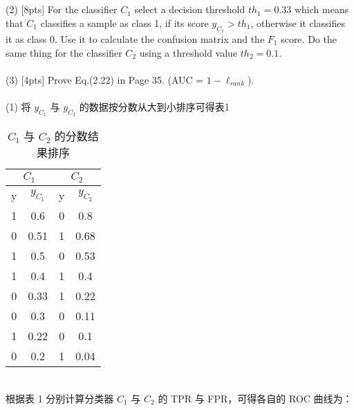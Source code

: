 \documentclass{article}
\begin{document}
	\\\\
	(2) [8pts] For the classifier $C_1$ select a decision threshold $th_1 = 0.33$ which means that $C_1$ classifies a sample as class 1, if its score $y_{C_1} > th_1$, otherwise it classifies it as class 0. Use it to calculate the confusion matrix and the $F_1$ score. Do the same thing for the classifier $C_2$ using a threshold value $th_2 = 0.1$.\\\\
	(3) [4pts] Prove Eq.(2.22) in Page 35. (AUC = $1 - \ell_{rank}$). \\ \\
	(1) 将 $y_{C_{1}}$ 与 $y_{C_{2}}$ 的数据按分数从大到小排序可得表1\\
		\begin{table}[htbp]
		\centering	
		\begin{tabular}{cc|cc}
		\multicolumn{2}{c|}{$C_{1}$} & \multicolumn{2}{|c}{$C_{2}$} \\
		\hline
		y & $y_{C_{1}}$ & y & $y_{C_{2}}$ \\
		\hline
		1 & 0.6 & 0 & 0.8 \\
		0 & 0.51 & 1 & 0.68 \\
		1 & 0.5 & 0 & 0.53 \\
		1 & 0.4 & 1 & 0.4 \\
		0 & 0.33 & 1 & 0.22 \\
		0 & 0.3 & 0 & 0.11 \\
		1 & 0.22 & 0 & 0.1 \\
		0 & 0.2 & 1 & 0.04
		\end{tabular}
		\caption{$C_1$ 与 $C_{2}$ 的分数结果排序}
		\end{table} \\
		根据表 1 分别计算分类器 $C_1$ 与 $C_2$ 的 TPR 与 FPR，可得各自的 ROC 曲线为：\\
		 \\
\end{document}
